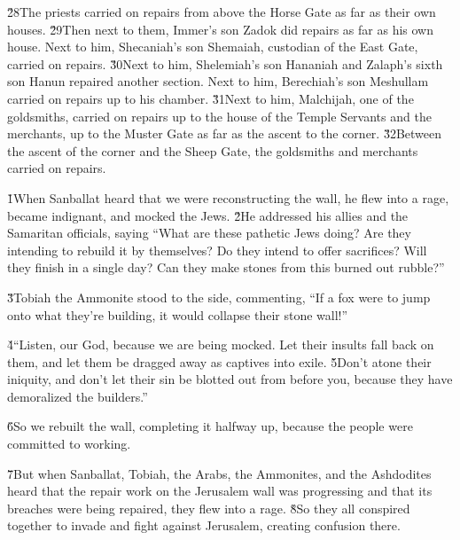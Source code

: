 \v{28}The priests carried on repairs from above the Horse Gate as far as their own houses. \v{29}Then next to them, Immer's son Zadok did repairs as far as his own house. Next to him, Shecaniah's son Shemaiah, custodian of the East Gate, carried on repairs. \v{30}Next to him, Shelemiah's son Hananiah and Zalaph's sixth son Hanun repaired another section. Next to him, Berechiah's son Meshullam carried on repairs up to his chamber. \v{31}Next to him, Malchijah, one of the goldsmiths, carried on repairs up to the house of the Temple Servants and the merchants, up to the Muster Gate as far as the ascent to the corner. \v{32}Between the ascent of the corner and the Sheep Gate, the goldsmiths and merchants carried on repairs.

\v{1}When Sanballat heard that we were reconstructing the wall, he flew into a rage, became indignant, and mocked the Jews. \v{2}He addressed his allies and the Samaritan officials, saying ``What are these pathetic Jews doing? Are they intending to rebuild it by themselves? Do they intend to offer sacrifices? Will they finish in a single day? Can they make stones from this burned out rubble?''

\v{3}Tobiah the Ammonite stood to the side, commenting, ``If a fox were to jump onto what they're building, it would collapse their stone wall!''

\v{4}``Listen, our God, because we are being mocked. Let their insults fall back on them, and let them be dragged away as captives into exile. \v{5}Don't atone their iniquity, and don't let their sin be blotted out from before you, because they have demoralized the builders.''

\v{6}So we rebuilt the wall, completing it halfway up, because the people were committed to working.

\v{7}But when Sanballat, Tobiah, the Arabs, the Ammonites, and the Ashdodites heard that the repair work on the Jerusalem wall was progressing and that its breaches were being repaired, they flew into a rage. \v{8}So they all conspired together to invade and fight against Jerusalem, creating confusion there.

